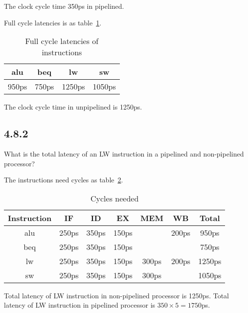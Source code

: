 \documentclass[paper=a4, fontsize=11pt]{scrartcl} %
\begin{document}
The clock cycle time 350ps in pipelined.

Full cycle latencies is as table~\ref{tab:fullcycle}.

\begin{table}[hp]
    \caption{Full cycle latencies of instructions}\label{tab:fullcycle}
    \begin{center}
        \begin{tabular}{cccc}
        \toprule
        \textbf{alu} & \textbf{beq} & \textbf{lw} & \textbf{sw} \\
        \midrule
        950ps & 750ps & 1250ps & 1050ps \\
        \bottomrule
        \end{tabular}
    \end{center}
\end{table}

The clock cycle time in unpipelined is 1250ps.


\subsection{4.8.2}
\begin{fancyquotes}
    What is the total latency of an LW instruction in a pipelined and non-pipelined processor?
\end{fancyquotes}

The instructions need cycles as table~\ref{tab:needed}.
\begin{table}[hp]
    \caption{Cycles needed}\label{tab:needed}
    \begin{center}
        \begin{tabular}{ccccccc}
        \toprule
        \textbf{Instruction} & \textbf{IF} & \textbf{ID} & \textbf{EX} & \textbf{MEM} & \textbf{WB} & \textbf{Total} \\
        \midrule
        alu & 250ps & 350ps & 150ps &       & 200ps & 950ps  \\
        beq & 250ps & 350ps & 150ps &       &       & 750ps  \\
        lw  & 250ps & 350ps & 150ps & 300ps & 200ps & 1250ps \\
        sw  & 250ps & 350ps & 150ps & 300ps &       & 1050ps \\
        \bottomrule
        \end{tabular}
    \end{center}
\end{table}

Total latency of LW instruction in non-pipelined processor is 1250ps.
Total latency of LW instruction in pipelined processor is $350\times 5 = 1750$ps.
\end{document}
